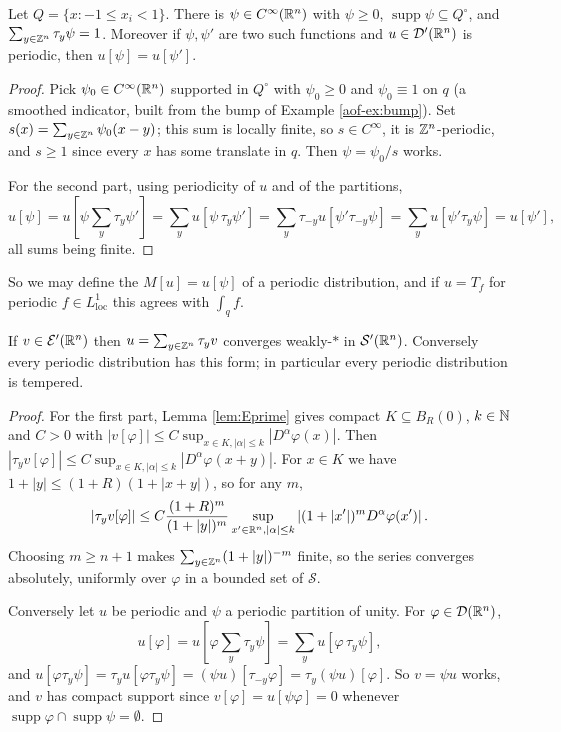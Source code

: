 \documentclass[a4paper]{scrartcl}
\newcommand{\Sch}{\mathcal{S}}
\newcommand{\Ecal}{\mathcal{E}}
\DeclareMathOperator{\supp}{supp}
\begin{document}
\begin{lemma}\label{lem:partunity}
	Let $Q=\{x:-1\le x_i<1\}$. There is $\psi\in C^\infty(\mathbb{R}^n)$ with $\psi\ge0$, $\supp\psi\subseteq Q^\circ$, and $\sum_{y\in\mathbb{Z}^n}\tau_y\psi=1$. Moreover if $\psi,\psi'$ are two such functions and $u\in\mathcal{D}'(\mathbb{R}^n)$ is periodic, then $u[\psi]=u[\psi']$.
\end{lemma}

\begin{proof}
	Pick $\psi_0\in C^\infty(\mathbb{R}^n)$ supported in $Q^\circ$ with $\psi_0\ge0$ and $\psi_0\equiv1$ on $q$ (a smoothed indicator, built from the bump of Example \ref{aof-ex:bump}). Set $s(x)=\sum_{y\in\mathbb{Z}^n}\psi_0(x-y)$; this sum is locally finite, so $s\in C^\infty$, it is $\mathbb{Z}^n$-periodic, and $s \ge 1$ since every $x$ has some translate in $q$. Then $\psi=\psi_0/s$ works.

	For the second part, using periodicity of $u$ and of the partitions,
	$$u[\psi]=u\!\left[\psi\sum_{y}\tau_y\psi'\right]=\sum_yu[\psi\,\tau_y\psi']=\sum_y\tau_{-y}u[\psi'\tau_{-y}\psi]=\sum_yu[\psi'\tau_y\psi]=u[\psi'],$$
	all sums being finite.
\end{proof}

So we may define the  $M[u]=u[\psi]$ of a periodic distribution, and if $u = T_f$ for periodic $f\in L^1_{\mathrm{loc}}$ this agrees with $\int_qf$.

\begin{lemma}\label{lem:periodictempered}
	If $v\in\Ecal'(\R^n)$ then $u=\sum_{y\in\mathbb{Z}^n}\tau_yv$ converges weakly-$*$ in $\Sch'(\R^n)$. Conversely every periodic distribution has this form; in particular every periodic distribution is tempered.
\end{lemma}

\begin{proof}
	For the first part, Lemma \ref{lem:Eprime} gives compact $K \subseteq B_R(0)$, $k\in\mathbb{N}$ and $C>0$ with $|v[\varphi]|\le C\sup_{x\in K,|\alpha|\le k}|D^\alpha\varphi(x)|$. Then $|\tau_yv[\varphi]|\le C\sup_{x\in K,|\alpha|\le k}|D^\alpha\varphi(x+y)|$. For $x \in K$ we have $1+|y|\le(1+R)(1+|x+y|)$, so for any $m$,
	$$|\tau_yv[\varphi]|\le C\frac{(1+R)^m}{(1+|y|)^m}\sup_{x'\in\mathbb{R}^n,|\alpha|\le k}\left|(1+|x'|)^mD^\alpha\varphi(x')\right|.$$
	Choosing $m \ge n+1$ makes $\sum_{y\in\mathbb{Z}^n}(1+|y|)^{-m}$ finite, so the series converges absolutely, uniformly over $\varphi$ in a bounded set of $\Sch$.

	Conversely let $u$ be periodic and $\psi$ a periodic partition of unity. For $\varphi\in\mathcal{D}(\mathbb{R}^n)$,
	$$u[\varphi]=u\!\left[\varphi\sum_y\tau_y\psi\right]=\sum_yu[\varphi\,\tau_y\psi],$$
	and $u[\varphi\tau_y\psi]=\tau_yu[\varphi\tau_y\psi]=(\psi u)[\tau_{-y}\varphi]=\tau_y(\psi u)[\varphi]$. So $v=\psi u$ works, and $v$ has compact support since $v[\varphi]=u[\psi\varphi]=0$ whenever $\supp\varphi\cap\supp\psi=\emptyset$.
\end{proof}
\end{document}
